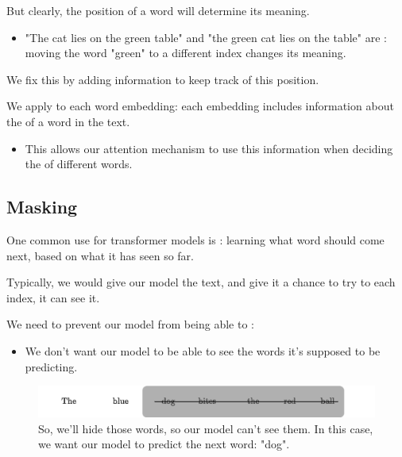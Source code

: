     But clearly, the position of a word will determine its meaning.

    \begin{itemize}
        \item \miniex "The cat lies on the green table" and "the green cat lies on the table" are : moving the word "green" to a different index changes its meaning.
    \end{itemize}

    We fix this by adding information to keep track of this position.\\

    \begin{definition}
        We apply  to each word embedding: each embedding includes information about the  of a word in the text.

        \begin{itemize}
            \item This allows our attention mechanism to use this information when deciding the  of different words.
        \end{itemize}
    \end{definition}

\phantom{}

\subsection{Masking}

    One common use for transformer models is : learning what word should come next, based on what it has seen so far.

    Typically, we would give our model the text, and give it a chance to try to  each index,  it can see it.

    We need to prevent our model from being able to :

    \begin{itemize}
        \item We don't want our model to be able to see the words it's supposed to be predicting.
    \end{itemize}

    \begin{figure}[H]
        \centering
        \includegraphics[width=0.6\linewidth]{images/transformers_images/masking.png}
        \caption*{So, we'll hide those words, so our model can't see them. In this case, we want our model to predict the next word: "dog".}
    \end{figure}

